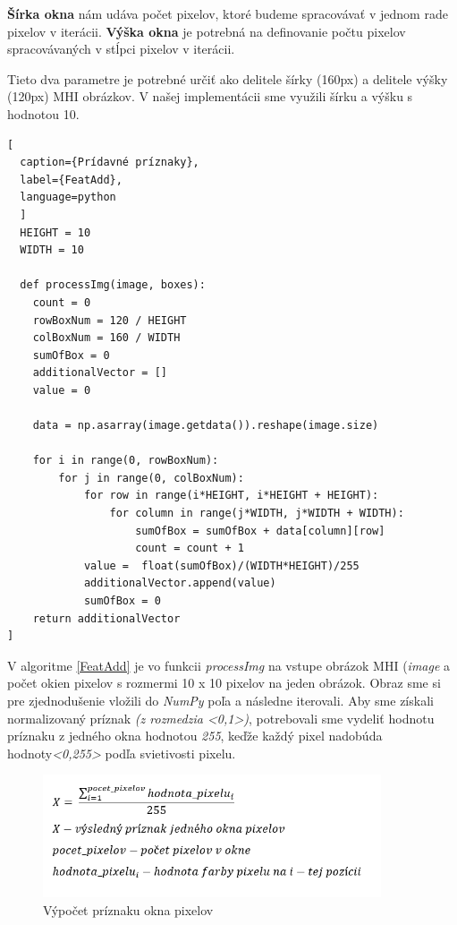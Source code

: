\textbf{Šírka okna} nám udáva počet pixelov, ktoré budeme spracovávať v jednom rade pixelov v iterácii.
\textbf{Výška okna} je potrebná na definovanie počtu pixelov spracovávaných v stĺpci pixelov v iterácii.

Tieto dva parametre je potrebné určiť ako delitele šírky (160px) a delitele výšky (120px) MHI obrázkov. V našej implementácii sme využili šírku a výšku s hodnotou 10.

\begin{lstlisting}[
  caption={Prídavné príznaky},
  label={FeatAdd},
  language=python
  ]
  HEIGHT = 10 
  WIDTH = 10
  
  def processImg(image, boxes):
    count = 0
    rowBoxNum = 120 / HEIGHT
    colBoxNum = 160 / WIDTH
    sumOfBox = 0
    additionalVector = []
    value = 0
        
    data = np.asarray(image.getdata()).reshape(image.size)
    
    for i in range(0, rowBoxNum):
        for j in range(0, colBoxNum):
            for row in range(i*HEIGHT, i*HEIGHT + HEIGHT):
                for column in range(j*WIDTH, j*WIDTH + WIDTH):
                    sumOfBox = sumOfBox + data[column][row] 
                    count = count + 1
            value =  float(sumOfBox)/(WIDTH*HEIGHT)/255
            additionalVector.append(value)
            sumOfBox = 0
    return additionalVector
]

\end{lstlisting}

V algoritme \ref{FeatAdd} je vo funkcii \textit{processImg} na vstupe obrázok MHI (\textit{image} a počet okien pixelov s rozmermi 10 x 10 pixelov na jeden obrázok. Obraz sme si pre zjednodušenie vložili do \textit{NumPy} poľa a následne iterovali. Aby sme získali normalizovaný príznak \textit{(z rozmedzia <0,1>)}, potrebovali sme vydeliť hodnotu príznaku z jedného okna hodnotou \textit{255}, keďže každý pixel nadobúda hodnoty\textit{<0,255>} podľa svietivosti pixelu.

\begin{figure}[H]
  \centering
  \includegraphics[width=10cm]{img/AddFeat.png}
  \caption{Výpočet príznaku okna pixelov}
  \label{MHIbox}
\end{figure}   

